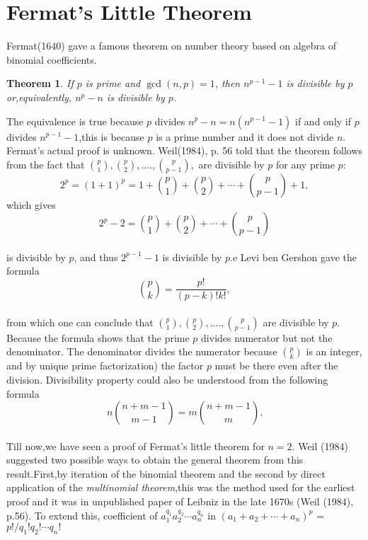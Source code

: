 \documentclass[a4paper,reqno,11pt]{book}
\theoremstyle{plain}%
\newtheorem{thm}{Theorem}[chapter]
\theoremstyle{definition}
\begin{document}
\section{Fermat’s Little Theorem}
Fermat(1640) gave a famous theorem on number theory based on algebra of binomial coefficients.\\
\begin{thm}\label{thm:Type 1}If $p$ is prime and $\gcd(n, p) = 1$, then $n^{p-1} - 1$ is divisible by $p$ or,equivalently, $n^p - n$ is divisible by $p$.\\
\end{thm}
The equivalence is true because $p$ divides $n^p - n = n(n^{p-1} - 1)$
if and only if $p$ divides $n^{p-1} - 1$,this is because $p$ is a prime number and it does not divide $n$. Fermat's actual proof is unknown. Weil(1984), p. 56 told that the theorem follows from the fact that $\binom{p}{1},\binom{p}{2},....,\binom{p}{p-1},$ are divisible by $p$ for any prime $p$:\\
$$2^p = (1+1)^p = 1 + \binom{p}{1} + \binom{p}{2} + \cdots + \binom{p}{p-1} + 1, $$
which gives\\
$$2^p - 2 = \binom{p}{1} + \binom{p}{2} + \cdots + \binom{p}{p-1} $$\\
is divisible by $p$, and thus $2^{p-1} -1 $ is divisible by $p$.e Levi ben Gershon gave the formula\\
$$\binom{p}{k} = \frac{p!}{(p-k)!k!},$$
\\
from which one can conclude that $\binom{p}{1},\binom{p}{2},....,\binom{p}{p-1}$ are divisible by $p$.
Because the formula shows that the prime $p$ divides numerator but not the
denominator. The denominator divides the numerator because $\binom{p}{k}$
is an integer, and by unique prime factorization) the factor $p$ must
be there even after the division. Divisibility property could also be understood from the following formula\\
$$n\binom{n+m-1}{m-1} = m\binom{n+m-1}{m}.$$
\\
Till now,we have seen a proof of Fermat’s little theorem for $n = 2$. Weil
(1984) suggested two possible ways to obtain the general theorem from this result.First,by iteration of the binomial theorem and the second by
direct application of the \textit{multinomial theorem},this was the method used for the earliest proof and it was in unpublished paper of Leibniz in the late 1670s (Weil (1984), p.56). To extend this,
coefficient of $a_{1}^{q_{1}}a_{2}^{q_{2}}\cdots a_{n}^{q_{n}}$ in $(a_{1} + a_{2} + \cdots + a_{n})^p$ = $p!/q_{1}!q_{2}!\cdots q_{n}!$
\end{document}
